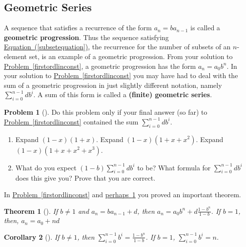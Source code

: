\documentclass[10pt,]{book}
\newcommand{\terminology}[1]{\textbf{#1}}
\theoremstyle{plain}
\newtheorem{theorem}{Theorem}[section]
\newtheorem{corollary}[theorem]{Corollary}
\theoremstyle{definition}
\newtheorem{activity}[project]{Problem}
\theoremstyle{definition}
\numberwithin{equation}{chapter}
\begin{document}
\subsection[{Geometric Series}]{Geometric Series}\label{subsection-20}
\hypertarget{p-582}{}%
A sequence that satisfies a recurrence of the form \(a_n=ba_{n-1}\) is called a \terminology{geometric progression}. Thus the sequence satisfying \hyperref[subsetequation]{Equation~(\ref{subsetequation})}, the recurrence for the number of subsets of an \(n\)-element set, is an example of a geometric progression. From your solution to \hyperref[firstordlinconst]{Problem~\ref{firstordlinconst}}, a geometric progression has the form \(a_n=a_0b^n\). In your solution to \hyperref[firstordlinconst]{Problem~\ref{firstordlinconst}} you may have had to deal with the sum of a geometric progression in just slightly different notation, namely \(\sum_{i=0}^{n-1}db^i\). A sum of this form is called a \terminology{(finite) geometric series}.%
\begin{activity}[]\marginsymbol[-1em]{} \label{sumgeometricseries}
\hypertarget{p-583}{}%
Do this problem only if your final answer (so far) to \hyperref[firstordlinconst]{Problem~\ref{firstordlinconst}} contained the sum \(\sum_{i=0}^{n-1}db^i\).%
\begin{enumerate}[font=\bfseries,label=(\alph*),ref=\alph*]
\item\label{task-89} \marginsymbol[-2.5em]{} \hypertarget{p-584}{}%
Expand \((1-x)(1+x)\).  Expand \((1-x)(1+x+x^2)\). Expand \((1-x)(1+x+x^2+x^3)\).%
\item\label{task-90} \marginsymbol[-2.5em]{} \hypertarget{p-586}{}%
What do you expect \((1-b)\sum_{i=0}^{n-1} db^i\) to be?  What formula for \(\sum_{i=0}^{n-1}db^i\) does this give you?  Prove that you are correct.%
\end{enumerate}
\end{activity}
\hypertarget{p-589}{}%
In \hyperref[firstordlinconst]{Problem~\ref{firstordlinconst}} and \hyperref[sumgeometricseries]{perhaps~\ref{sumgeometricseries}} you proved an important theorem.%
\begin{theorem}[{}]\label{theorem-2}
\hypertarget{p-590}{}%
If \(b\not=1\) and \(a_n=ba_{n-1} +d\), then \(\displaystyle a_n =
a_0b^n + d\frac{1-b^n}{1-b}\). If \(b=1\), then, \(\displaystyle a_n =
a_0 +nd\)%
\end{theorem}
\begin{corollary}[{}]\label{corollary-1}
\hypertarget{p-591}{}%
If \(b\not=1\), then \(\displaystyle \sum_{i=0}^{n-1}b^i =
\frac{1-b^n}{1-b}\). If \(b=1\), \(\displaystyle \sum_{i=0}^{n-1}b^i =n\).%
\end{corollary}
\typeout{************************************************}
\typeout{************************************************}
\end{document}
